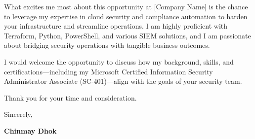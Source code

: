 \documentclass[11pt, letterpaper]{article}
\begin{document}
What excites me most about this opportunity at {[}Company Name{]} is the chance to leverage my expertise in cloud security and compliance automation to harden your infrastructure and streamline operations. I am highly proficient with Terraform, Python, PowerShell, and various SIEM solutions, and I am passionate about bridging security operations with tangible business outcomes.

I would welcome the opportunity to discuss how my background, skills, and certifications—including my Microsoft Certified Information Security Administrator Associate (SC-401)—align with the goals of your security team. 

Thank you for your time and consideration.

\vspace{0.2in}

Sincerely,

\vspace{0.1in}

\textbf{Chinmay Dhok}
\end{document}
